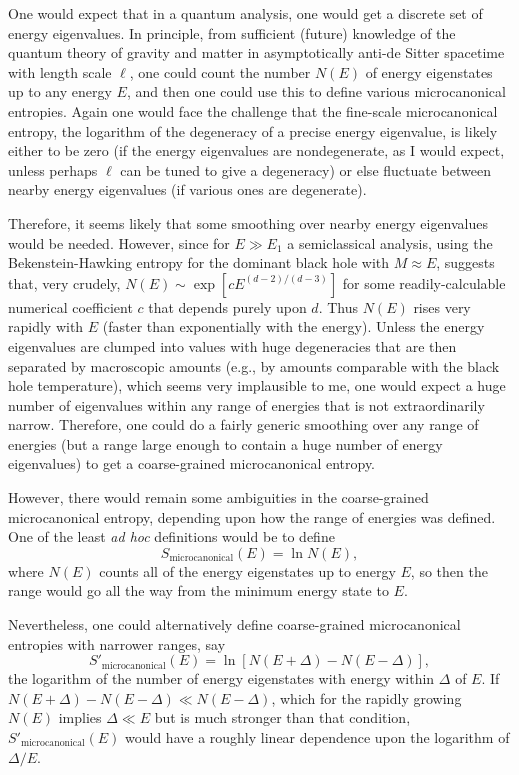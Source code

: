 \documentclass[12pt]{article} \usepackage{latexsym}
\begin{document}
One would expect that in a quantum analysis, one would get a discrete
set of energy eigenvalues.  In principle, from sufficient (future)
knowledge of the quantum theory of gravity and matter in asymptotically
anti-de Sitter spacetime with length scale $\ell$, one could count the
number $N(E)$ of energy eigenstates up to any energy $E$, and then one
could use this to define various microcanonical entropies.  Again one
would face the challenge that the fine-scale microcanonical entropy,
the logarithm of the degeneracy of a precise energy eigenvalue, is
likely either to be zero (if the energy eigenvalues are nondegenerate,
as I would expect, unless perhaps $\ell$ can be tuned to give a
degeneracy) or else fluctuate between nearby energy eigenvalues (if
various ones are degenerate).

Therefore, it seems likely that some smoothing over nearby energy
eigenvalues would be needed.  However, since for $E \gg E_1$ a
semiclassical analysis, using the Bekenstein-Hawking entropy for the
dominant black hole with $M \approx E$, suggests that, very crudely,
$N(E) \sim \exp{[c E^{(d-2)/(d-3)}]}$ for some readily-calculable
numerical coefficient $c$ that depends purely upon $d$.  Thus $N(E)$
rises very rapidly with $E$ (faster than exponentially with the
energy).  Unless the energy eigenvalues are clumped into values with
huge degeneracies that are then separated by macroscopic amounts (e.g.,
by amounts comparable with the black hole temperature), which seems
very implausible to me, one would expect a huge number of eigenvalues
within any range of energies that is not extraordinarily narrow. 
Therefore, one could do a fairly generic smoothing over any range of
energies (but a range large enough to contain a huge number of energy
eigenvalues) to get a coarse-grained microcanonical entropy.

However, there would remain some ambiguities in the coarse-grained
microcanonical entropy, depending upon how the range of energies was
defined.  One of the least {\it ad hoc} definitions would be to define
 \begin{equation}
 S_{\mathrm{microcanonical}}(E) = \ln{N(E)},
 \label{eq:25}
 \end{equation}
where $N(E)$ counts all of the energy eigenstates up to energy $E$, so
then the range would go all the way from the minimum energy state to
$E$.

Nevertheless, one could alternatively define coarse-grained
microcanonical entropies with narrower ranges, say
 \begin{equation}
 S'_{\mathrm{microcanonical}}(E) = \ln{[N(E+\Delta)-N(E-\Delta)]},
 \label{eq:26}
 \end{equation}
the logarithm of the number of energy eigenstates with energy within
$\Delta$ of $E$.  If $N(E+\Delta)-N(E-\Delta) \ll N(E-\Delta)$, which
for the rapidly growing $N(E)$ implies $\Delta \ll E$ but is much
stronger than that condition, $S'_{\mathrm{microcanonical}}(E)$ would
have a roughly linear dependence upon the logarithm of $\Delta/E$.
\end{document}
